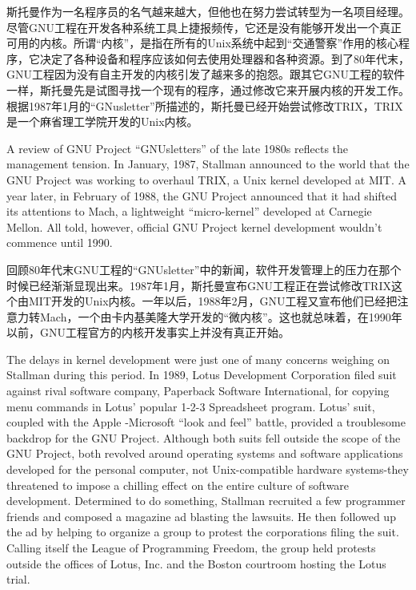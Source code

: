 \ifdefined\chs
斯托曼作为一名程序员的名气越来越大，但他也在努力尝试转型为一名项目经理。尽管GNU工程在开发各种系统工具上捷报频传，它还是没有能够开发出一个真正可用的内核。所谓``内核''，是指在所有的Unix系统中起到``交通警察''作用的核心程序，它决定了各种设备和程序应该如何去使用处理器和各种资源。到了80年代末，GNU工程因为没有自主开发的内核引发了越来多的抱怨。跟其它GNU工程的软件一样，斯托曼先是试图寻找一个现有的程序，通过修改它来开展内核的开发工作。根据1987年1月的``GNusletter''所描述的，斯托曼已经开始尝试修改TRIX，TRIX是一个麻省理工学院开发的Unix内核。
\fi

\ifdefined\eng
A review of GNU Project ``GNUsletters'' of the late 1980s reflects the management tension. In January, 1987, Stallman announced to the world that the GNU Project was working to overhaul TRIX, a Unix kernel developed at MIT. A year later, in February of 1988, the GNU Project announced that it had shifted its attentions to Mach, a lightweight ``micro-kernel'' developed at Carnegie Mellon. All told, however, official GNU Project kernel development wouldn't commence until 1990. 
\fi

\ifdefined\chs
回顾80年代末GNU工程的``GNUsletter''中的新闻，软件开发管理上的压力在那个时候已经渐渐显现出来。1987年1月，斯托曼宣布GNU工程正在尝试修改TRIX这个由MIT开发的Unix内核。一年以后，1988年2月，GNU工程又宣布他们已经把注意力转Mach，一个由卡内基美隆大学开发的``微内核''。这也就总味着，在1990年以前，GNU工程官方的内核开发事实上并没有真正开始。
\fi

\ifdefined\eng
The delays in kernel development were just one of many concerns weighing on Stallman during this period. In 1989, Lotus Development Corporation filed suit against rival software company, Paperback Software International, for copying menu commands in Lotus' popular 1-2-3 Spreadsheet program. Lotus' suit, coupled with the Apple -Microsoft ``look and feel'' battle, provided a troublesome backdrop for the GNU Project. Although both suits fell outside the scope of the GNU Project, both revolved around operating systems and software applications developed for the personal computer, not Unix-compatible hardware systems-they threatened to impose a chilling effect on the entire culture of software development. Determined to do something, Stallman recruited a few programmer friends and composed a magazine ad blasting the lawsuits. He then followed up the ad by helping to organize a group to protest the corporations filing the suit. Calling itself the League of Programming Freedom, the group held protests outside the offices of Lotus, Inc. and the Boston courtroom hosting the Lotus trial.
\fi

